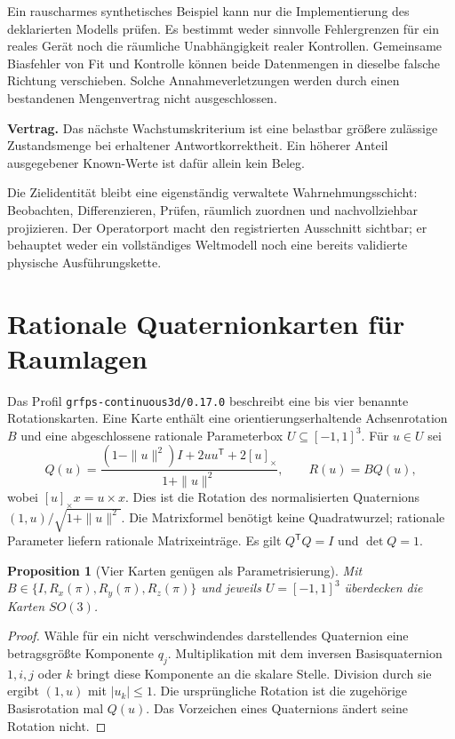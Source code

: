 \documentclass[11pt,a4paper]{article}
\newcommand{\contract}[1]{\vspace{3pt}\noindent\colorbox{pale}{\parbox{\dimexpr\linewidth-2\fboxsep}{\textbf{Vertrag.} #1}}\vspace{5pt}}
\newcommand{\nextsection}[2]{\clearpage{\color{accent}\small\textsf{#1}}\section{#2}}
\newtheorem{proposition}{Proposition}[section]
\begin{document}
Ein rauscharmes synthetisches Beispiel kann nur die Implementierung
des deklarierten Modells prüfen. Es bestimmt weder sinnvolle Fehlergrenzen
für ein reales Gerät noch die räumliche Unabhängigkeit realer Kontrollen.
Gemeinsame Biasfehler von Fit und Kontrolle können beide Datenmengen
in dieselbe falsche Richtung verschieben. Solche Annahmeverletzungen
werden durch einen bestandenen Mengenvertrag nicht ausgeschlossen.

\contract{Das nächste Wachstumskriterium ist eine belastbar größere
zulässige Zustandsmenge bei erhaltener Antwortkorrektheit. Ein
höherer Anteil ausgegebener Known-Werte ist dafür allein kein Beleg.}

Die Zielidentität bleibt eine eigenständig verwaltete Wahrnehmungsschicht:
Beobachten, Differenzieren, Prüfen, räumlich zuordnen und nachvollziehbar
projizieren. Der Operatorport macht den registrierten Ausschnitt
sichtbar; er behauptet weder ein vollständiges Weltmodell noch eine
bereits validierte physische Ausführungskette.


\nextsection{98 / KONTINUIERLICHE ROTATION}{Rationale Quaternionkarten für Raumlagen}
Das Profil \texttt{grfps-continuous3d/0.17.0} beschreibt eine bis vier
benannte Rotationskarten. Eine Karte enthält eine orientierungserhaltende
Achsenrotation $B$ und eine abgeschlossene rationale Parameterbox
$U\subseteq[-1,1]^3$. Für $u\in U$ sei
\[
 Q(u)=\frac{(1-\|u\|^2)I+2uu^{\mathsf T}+2[u]_\times}
                 {1+\|u\|^2},\qquad R(u)=B Q(u),
\]
wobei $[u]_\times x=u\times x$. Dies ist die Rotation des
normalisierten Quaternions $(1,u)/\sqrt{1+\|u\|^2}$. Die Matrixformel
benötigt keine Quadratwurzel; rationale Parameter liefern rationale
Matrixeinträge. Es gilt $Q^{\mathsf T}Q=I$ und $\det Q=1$.

\begin{proposition}[Vier Karten genügen als Parametrisierung]
Mit $B\in\{I,R_x(\pi),R_y(\pi),R_z(\pi)\}$ und jeweils
$U=[-1,1]^3$ überdecken die Karten $SO(3)$.
\end{proposition}
\begin{proof}
Wähle für ein nicht verschwindendes darstellendes Quaternion eine
betragsgrößte Komponente $q_j$. Multiplikation mit dem inversen
Basisquaternion $1,i,j$ oder $k$ bringt diese Komponente an die
skalare Stelle. Division durch sie ergibt $(1,u)$ mit
$|u_k|\leq1$. Die ursprüngliche Rotation ist die zugehörige
Basisrotation mal $Q(u)$. Das Vorzeichen eines Quaternions ändert
seine Rotation nicht.
\end{proof}
\end{document}
